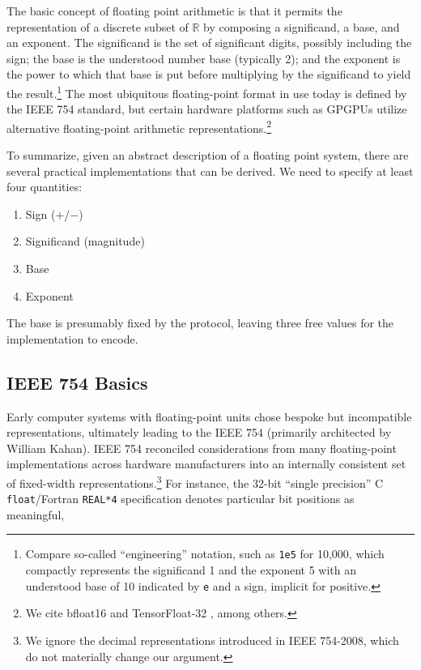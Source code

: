 \documentclass[twoside]{article}
\begin{document}
The basic concept of floating point arithmetic is that it permits the representation of a discrete subset of $\mathbb{R}$ by composing a significand, a base, and an exponent.  The significand is the set of significant digits, possibly including the sign; the base is the understood number base (typically 2); and the exponent is the power to which that base is put before multiplying by the significand to yield the result.\footnote{Compare so-called “engineering” notation, such as \texttt{1e5} for 10,000, which compactly represents the significand 1 and the exponent 5 with an understood base of 10 indicated by \texttt{e} and a sign, implicit for positive.}  The most ubiquitous floating-point format in use today is defined by the IEEE 754 standard, but certain hardware platforms such as GPGPUs utilize alternative floating-point arithmetic representations.\footnote{We cite bfloat16 \citep{Wang2019} and TensorFloat-32 \citep{Kharva2020}, among others.}

To summarize, given an abstract description of a floating point system, there are several practical implementations that can be derived.  We need to specify at least four quantities:

\begin{enumerate}
  \item  Sign ($+$/$-$)
  \item  Significand (magnitude)
  \item  Base
  \item  Exponent
\end{enumerate}

\noindent
The base is presumably fixed by the protocol, leaving three free values for the implementation to encode.


\subsection{IEEE 754 Basics}

Early computer systems with floating-point units chose bespoke but incompatible representations, ultimately leading to the IEEE 754 (primarily architected by William Kahan).  IEEE 754 reconciled considerations from many floating-point implementations across hardware manufacturers into an internally consistent set of fixed-width representations.\footnote{We ignore the decimal representations introduced in IEEE 754-2008, which do not materially change our argument.}  For instance, the 32-bit “single precision” C \texttt{float}/Fortran \texttt{REAL*4} specification denotes particular bit positions as meaningful,
\end{document}
